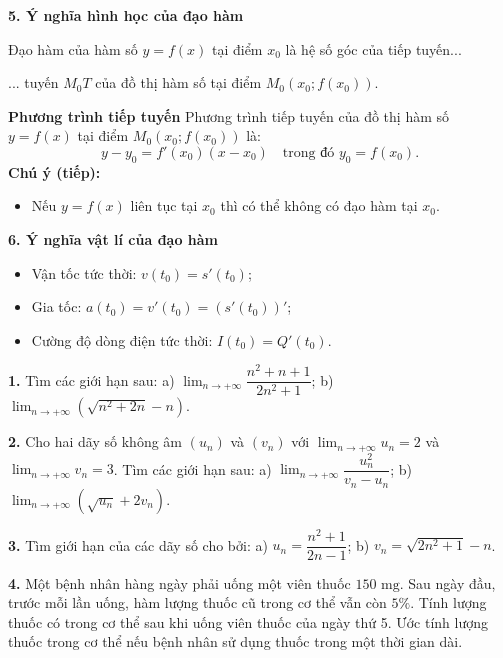 \documentclass[12pt,a4paper]{extarticle}
\begin{document}
\noindent\textbf{5. Ý nghĩa hình học của đạo hàm}

\noindent Đạo hàm của hàm số $y = f(x)$ tại điểm $x_0$ là hệ số góc của tiếp tuyến...

\noindent ... tuyến $M_0T$ của đồ thị hàm số tại điểm $M_0(x_0; f(x_0))$.
\vspace{0.3cm}

\noindent\textbf{Phương trình tiếp tuyến}
\noindent Phương trình tiếp tuyến của đồ thị hàm số $y = f(x)$ tại điểm $M_0(x_0; f(x_0))$ là:
\[ y - y_0 = f'(x_0)(x - x_0) \quad \text{trong đó } y_0 = f(x_0). \]
\vspace{0.3cm}
\noindent\textbf{Chú ý (tiếp):}
\begin{itemize}
    \item[+] Nếu $y = f(x)$ liên tục tại $x_0$ thì có thể không có đạo hàm tại $x_0$.
\end{itemize}
\vspace{0.4cm}
\noindent\textbf{6. Ý nghĩa vật lí của đạo hàm}
\begin{itemize}
    \item[+] Vận tốc tức thời: $v(t_0) = s'(t_0)$;
    \item[+] Gia tốc: $a(t_0) = v'(t_0) = (s'(t_0))'$;
    \item[+] Cường độ dòng điện tức thời: $I(t_0) = Q'(t_0)$.
\end{itemize}


\noindent\textbf{1.} Tìm các giới hạn sau:
\noindent a) $\lim_{n \to +\infty} \dfrac{n^2 + n + 1}{2n^2 + 1}$;
\noindent b) $\lim_{n \to +\infty} \left(\sqrt{n^2 + 2n} - n\right)$.
\vspace{0.4cm}

\noindent\textbf{2.} Cho hai dãy số không âm $(u_n)$ và $(v_n)$ với $\lim_{n \to +\infty} u_n = 2$ và $\lim_{n \to +\infty} v_n = 3$. Tìm các giới hạn sau:
\noindent a) $\lim_{n \to +\infty} \dfrac{u_n^2}{v_n - u_n}$;
\noindent b) $\lim_{n \to +\infty} \left(\sqrt{u_n} + 2v_n\right)$.
\vspace{0.4cm}

\noindent\textbf{3.} Tìm giới hạn của các dãy số cho bởi:
\noindent a) $u_n = \dfrac{n^2 + 1}{2n - 1}$;
\noindent b) $v_n = \sqrt{2n^2 + 1} - n$.
\vspace{0.4cm}

\noindent\textbf{4.} Một bệnh nhân hàng ngày phải uống một viên thuốc $150\text{ mg}$. Sau ngày đầu, trước mỗi lần uống, hàm lượng thuốc cũ trong cơ thể vẫn còn $5\%$. Tính lượng thuốc có trong cơ thể sau khi uống viên thuốc của ngày thứ 5. Ước tính lượng thuốc trong cơ thể nếu bệnh nhân sử dụng thuốc trong một thời gian dài.
\vspace{0.4cm}
\end{document}
